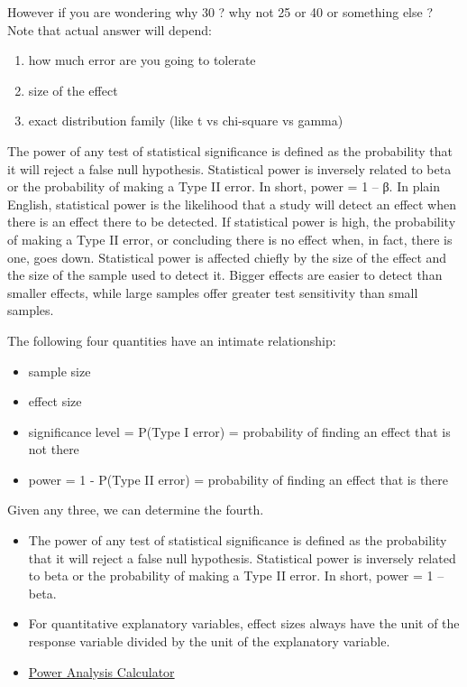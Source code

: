 \documentclass[]{book}
\begin{document}
However if you are wondering why 30 ? why not 25 or 40 or something else
? Note that actual answer will depend:

\begin{enumerate}
\def\labelenumi{\arabic{enumi})}
\item
  how much error are you going to tolerate
\item
  size of the effect
\item
  exact distribution family (like t vs chi-square vs gamma)
\end{enumerate}

The power of any test of statistical significance is defined as the
probability that it will reject a false null hypothesis. Statistical
power is inversely related to beta or the probability of making a Type
II error. In short, power = 1 -- β. In plain English, statistical power
is the likelihood that a study will detect an effect when there is an
effect there to be detected. If statistical power is high, the
probability of making a Type II error, or concluding there is no effect
when, in fact, there is one, goes down. Statistical power is affected
chiefly by the size of the effect and the size of the sample used to
detect it. Bigger effects are easier to detect than smaller effects,
while large samples offer greater test sensitivity than small samples.

The following four quantities have an intimate relationship:

\begin{itemize}
\item
  sample size
\item
  effect size
\item
  significance level = P(Type I error) = probability of finding an
  effect that is not there
\item
  power = 1 - P(Type II error) = probability of finding an effect that
  is there
\end{itemize}

Given any three, we can determine the fourth.

\begin{itemize}
\item
  The power of any test of statistical significance is defined as the
  probability that it will reject a false null hypothesis. Statistical
  power is inversely related to beta or the probability of making a Type
  II error. In short, power = 1 -- beta.
\item
  For quantitative explanatory variables, effect sizes always have the
  unit of the response variable divided by the unit of the explanatory
  variable.
\item
  \href{http://www.evanmiller.org/ab-testing/sample-size.html}{Power
  Analysis Calculator}
\end{itemize}
\end{document}
